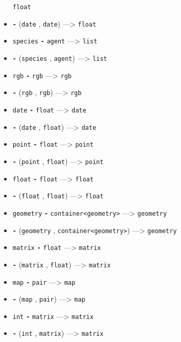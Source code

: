 \documentclass[]{book}
\theoremstyle{definition}
\theoremstyle{definition}
\theoremstyle{definition}
\theoremstyle{remark}
\begin{document}
\begin{itemize}
  \texttt{float}
\item
  \textbf{\texttt{-}} (\texttt{date} , \texttt{date}) ---\textgreater{}
  \texttt{float}
\item
  \texttt{species} \textbf{\texttt{-}} \texttt{agent} ---\textgreater{}
  \texttt{list}
\item
  \textbf{\texttt{-}} (\texttt{species} , \texttt{agent})
  ---\textgreater{} \texttt{list}
\item
  \texttt{rgb} \textbf{\texttt{-}} \texttt{rgb} ---\textgreater{}
  \texttt{rgb}
\item
  \textbf{\texttt{-}} (\texttt{rgb} , \texttt{rgb}) ---\textgreater{}
  \texttt{rgb}
\item
  \texttt{date} \textbf{\texttt{-}} \texttt{float} ---\textgreater{}
  \texttt{date}
\item
  \textbf{\texttt{-}} (\texttt{date} , \texttt{float}) ---\textgreater{}
  \texttt{date}
\item
  \texttt{point} \textbf{\texttt{-}} \texttt{float} ---\textgreater{}
  \texttt{point}
\item
  \textbf{\texttt{-}} (\texttt{point} , \texttt{float})
  ---\textgreater{} \texttt{point}
\item
  \texttt{float} \textbf{\texttt{-}} \texttt{float} ---\textgreater{}
  \texttt{float}
\item
  \textbf{\texttt{-}} (\texttt{float} , \texttt{float})
  ---\textgreater{} \texttt{float}
\item
  \texttt{geometry} \textbf{\texttt{-}}
  \texttt{container\textless{}geometry\textgreater{}} ---\textgreater{}
  \texttt{geometry}
\item
  \textbf{\texttt{-}} (\texttt{geometry} ,
  \texttt{container\textless{}geometry\textgreater{}}) ---\textgreater{}
  \texttt{geometry}
\item
  \texttt{matrix} \textbf{\texttt{-}} \texttt{float} ---\textgreater{}
  \texttt{matrix}
\item
  \textbf{\texttt{-}} (\texttt{matrix} , \texttt{float})
  ---\textgreater{} \texttt{matrix}
\item
  \texttt{map} \textbf{\texttt{-}} \texttt{pair} ---\textgreater{}
  \texttt{map}
\item
  \textbf{\texttt{-}} (\texttt{map} , \texttt{pair}) ---\textgreater{}
  \texttt{map}
\item
  \texttt{int} \textbf{\texttt{-}} \texttt{matrix} ---\textgreater{}
  \texttt{matrix}
\item
  \textbf{\texttt{-}} (\texttt{int} , \texttt{matrix}) ---\textgreater{}
  \texttt{matrix}
\end{itemize}
\end{document}
